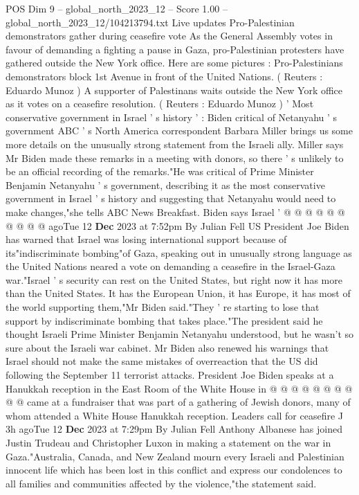 \begin{textsample}{POS Dim 9 – global\_north\_2023\_12 – Score 1.00 – global\_north\_2023\_12/104213794.txt}  \label{ex:f9_pos_170}
Live updates Pro-Palestinian demonstrators gather during ceasefire vote As the General Assembly votes in favour of demanding a fighting a pause in Gaza, pro-Palestinian protesters have gathered outside the New York office.
Here are some pictures : Pro-Palestinians demonstrators block 1st Avenue in front of the United Nations. ( Reuters : Eduardo Munoz ) A supporter of Palestinans waits outside the New York office as it votes on a ceasefire resolution. ( Reuters : Eduardo Munoz ) ' Most conservative government in Israel ' s history ' : Biden critical of Netanyahu ' s government ABC ' s North America correspondent Barbara Miller brings us some more details on the unusually strong statement from the Israeli ally.
Miller says Mr Biden made these remarks in a meeting with donors, so there ' s unlikely to be an official recording of the remarks."He was critical of Prime Minister Benjamin Netanyahu ' s government, describing it as the most conservative government in Israel ' s history and suggesting that Netanyahu would need to make changes,"she tells ABC News Breakfast.
Biden says Israel ' @ @ @ @ @ @ @ @ @ @ agoTue 12 \textbf{Dec} 2023 at 7:52pm By Julian Fell US President Joe Biden has warned that Israel was losing international support because of its"indiscriminate bombing"of Gaza, speaking out in unusually strong language as the United Nations neared a vote on demanding a ceasefire in the Israel-Gaza war."Israel ' s security can rest on the United States, but right now it has more than the United States.
It has the European Union, it has Europe, it has most of the world supporting them,"Mr Biden said."They ' re starting to lose that support by indiscriminate bombing that takes place."The president said he thought Israeli Prime Minister Benjamin Netanyahu understood, but he wasn't so sure about the Israeli war cabinet.
Mr Biden also renewed his warnings that Israel should not make the same mistakes of overreaction that the US did following the September 11 terrorist attacks.
President Joe Biden speaks at a Hanukkah reception in the East Room of the White House in @ @ @ @ @ @ @ @ @ @ came at a fundraiser that was part of a gathering of Jewish donors, many of whom attended a White House Hanukkah reception.
Leaders call for ceasefire J 3h agoTue 12 \textbf{Dec} 2023 at 7:29pm By Julian Fell Anthony Albanese has joined Justin Trudeau and Christopher Luxon in making a statement on the war in Gaza."Australia, Canada, and New Zealand mourn every Israeli and Palestinian innocent life which has been lost in this conflict and express our condolences to all families and communities affected by the violence,"the statement said.

\end{textsample}
